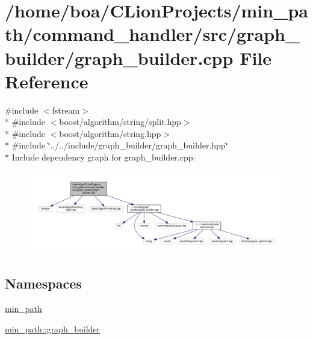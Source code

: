 \hypertarget{a00026}{}\section{/home/boa/\+C\+Lion\+Projects/min\+\_\+path/command\+\_\+handler/src/graph\+\_\+builder/graph\+\_\+builder.cpp File Reference}
\label{a00026}
{\ttfamily \#include $<$fstream$>$}\\*
{\ttfamily \#include $<$boost/algorithm/string/split.\+hpp$>$}\\*
{\ttfamily \#include $<$boost/algorithm/string.\+hpp$>$}\\*
{\ttfamily \#include \char`\"{}../../include/graph\+\_\+builder/graph\+\_\+builder.\+hpp\char`\"{}}\\*
Include dependency graph for graph\+\_\+builder.\+cpp\+:
\nopagebreak
\begin{figure}[H]
\begin{center}
\leavevmode
\includegraphics[width=350pt]{d1/d22/a00057}
\end{center}
\end{figure}
\subsection*{Namespaces}
\begin{DoxyCompactItemize}
\item 
 \hyperlink{a00033}{min\+\_\+path}
\item 
 \hyperlink{a00036}{min\+\_\+path\+::graph\+\_\+builder}
\end{DoxyCompactItemize}
